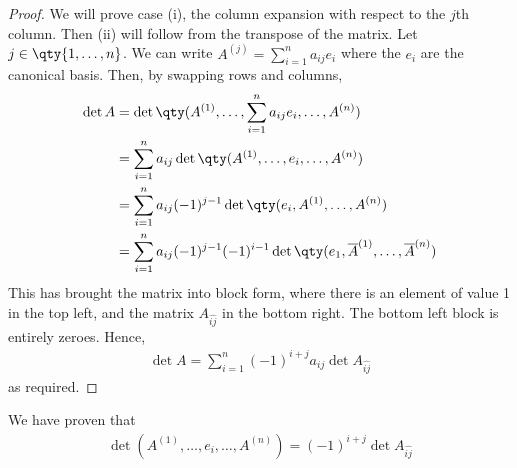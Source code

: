 \begin{proof}
	We will prove case (i), the column expansion with respect to the $j$th column.
	Then (ii) will follow from the transpose of the matrix.
	Let $j \in \qty{1, \dots, n}$.
	We can write $A^{(j)} = \sum_{i=1}^n a_{ij} e_i$ where the $e_i$ are the canonical basis.
	Then, by swapping rows and columns,
	\begin{align*}
		\det A & = \det\qty(A^{(1)}, \dots, \sum_{i=1}^n a_{ij} e_i, \dots, A^{(n)})                                    \\
		       & = \sum_{i=1}^n a_{ij} \det\qty(A^{(1)}, \dots, e_i, \dots, A^{(n)})                                    \\
		       & = \sum_{i=1}^n a_{ij} (-1)^{j-1} \det\qty(e_i, A^{(1)}, \dots, A^{(n)})                                \\
		       & = \sum_{i=1}^n a_{ij} (-1)^{j-1} (-1)^{i-1} \det\qty(e_1, \overline A^{(1)}, \dots, \overline A^{(n)})
	\end{align*}
	This has brought the matrix into block form, where there is an element of value 1 in the top left, and the matrix $A_{\widehat{ij}}$ in the bottom right.
	The bottom left block is entirely zeroes.
	Hence,
	\begin{align*}
		\det A = \sum_{i=1}^n (-1)^{i+j} a_{ij} \det A_{\widehat{ij}}
	\end{align*}
	as required.
\end{proof}
\begin{remark}
	We have proven that
	\begin{align*}
		\det (A^{(1)}, \dots, e_i, \dots, A^{(n)}) = (-1)^{i+j} \det A_{\widehat{ij}}
	\end{align*}
\end{remark}

